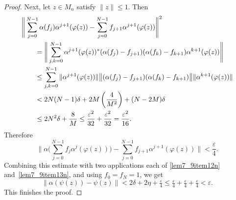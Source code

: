 \documentclass[11pt]{amsart}
\theoremstyle{plain}
\theoremstyle{definition}
\theoremstyle{remark}
\numberwithin{equation}{section}
\newcommand{\dt}{\delta}
\newcommand{\ep}{\varepsilon}
\begin{document}
\begin{proof}
Next, let $z \in M_{n}$ satisfy $\| z \| \leq 1$.
Then
%
\begin{align}\label{Eq_8615_SqErr}
& \Bigg\| \sum_{j = 0}^{N - 1} \alpha (f_j) \alpha^{j + 1} (\varphi (z))
       - \sum_{j = 0}^{N - 1}
           f_{j + 1} \alpha^{j + 1} (\varphi (z)) \Bigg\|^2
\\
& \hspace*{2em} {\mbox{}}
 = \Bigg\| \sum_{j, k = 0}^{N - 1} \alpha^{j + 1} (\varphi (z))^*
   (\alpha (f_{j}) - f_{j + 1}) (\alpha (f_{k}) - f_{k + 1})
      \alpha^{k + 1} (\varphi (z)) \Bigg\|
\notag
\\
& \hspace*{2em} {\mbox{}}
 \leq \sum_{j, k = 0}^{N - 1}
          \| \alpha^{j + 1} (\varphi (z)) \|
           \big\| (\alpha (f_{j}) - f_{j + 1})
                (\alpha (f_{k}) - f_{k + 1}) \big\|
           \| \alpha^{k + 1} (\varphi (z)) \|
\notag
\\
& \hspace*{2em} {\mbox{}}
 < 2 N (N - 1) \dt + 2 M \left( \frac{4}{M^2} \right)
         + (N - 2 M) \dt
\notag
\\
& \hspace*{2em} {\mbox{}}
 \leq 2 N^2 \dt + \frac{8}{M}
  \leq \frac{\ep^2}{32} + \frac{\ep^2}{32}
  = \frac{\ep^2}{16}.
\notag
\end{align}
%
Therefore
%
\[
\Bigg\|\alpha
 \Bigg(\sum_{j = 0}^{N - 1} f_{j} \alpha^{j} (\varphi (z)) \Bigg)
 - \sum_{j = 0}^{N - 1}
  f_{j + 1} \alpha^{j + 1} (\varphi (z)) \Bigg\|
 < \frac{\ep}{4}.
\]
%
Combining this estimate with two applications each
of \eqref{lem7_9item12n} and~\eqref{lem7_9item13n},
and using $f_0 = f_N = 1$,
we get
\[
\|\alpha (\psi (z)) - \psi (z) \|
 < 2 \delta + 2 \eta + \tfrac{\varepsilon}{4}
 \leq \tfrac{\varepsilon}{4}
    + \tfrac{\varepsilon}{4} + \tfrac{\varepsilon}{4}
 < \varepsilon.
\]
This finishes the proof.
\end{proof}
\end{document}
